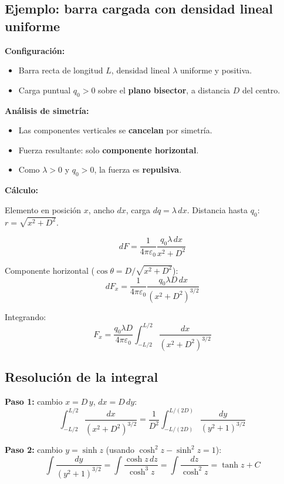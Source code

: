 \documentclass[12pt,a4paper]{article}
\begin{document}
\subsection{Ejemplo: barra cargada con densidad lineal uniforme}

\textbf{Configuración:}
\begin{itemize}[nosep]
  \item Barra recta de longitud $L$, densidad lineal $\lambda$
        uniforme y positiva.
  \item Carga puntual $q_0 > 0$ sobre el \textbf{plano bisector},
        a distancia $D$ del centro.
\end{itemize}

\textbf{Análisis de simetría:}
\begin{itemize}[nosep]
  \item Las componentes verticales se \textbf{cancelan} por simetría.
  \item Fuerza resultante: solo \textbf{componente horizontal}.
  \item Como $\lambda > 0$ y $q_0 > 0$, la fuerza es
        \textbf{repulsiva}.
\end{itemize}



\textbf{Cálculo:}

Elemento en posición $x$, ancho $dx$, carga $dq = \lambda\,dx$.
Distancia hasta $q_0$: $r = \sqrt{x^{2} + D^{2}}$.

\[
dF = \frac{1}{4\pi\varepsilon_0}
\frac{q_0 \lambda\,dx}{x^{2} + D^{2}}
\]

Componente horizontal ($\cos\theta = D/\sqrt{x^{2} + D^{2}}$):
\[
dF_x = \frac{1}{4\pi\varepsilon_0}
\frac{q_0 \lambda D\,dx}{(x^{2} + D^{2})^{3/2}}
\]

Integrando:
\[
F_x = \frac{q_0 \lambda D}{4\pi\varepsilon_0}
\int_{-L/2}^{L/2} \frac{dx}{(x^{2} + D^{2})^{3/2}}
\]

\subsection{Resolución de la integral}

\textbf{Paso 1:} cambio $x = D\,y$, $dx = D\,dy$:
\[
\int_{-L/2}^{L/2} \frac{dx}{(x^{2} + D^{2})^{3/2}}
= \frac{1}{D^{2}}
\int_{-L/(2D)}^{L/(2D)} \frac{dy}{(y^{2} + 1)^{3/2}}
\]

\textbf{Paso 2:} cambio $y = \sinh z$ (usando
$\cosh^{2} z - \sinh^{2} z = 1$):
\[
\int \frac{dy}{(y^{2} + 1)^{3/2}}
= \int \frac{\cosh z\,dz}{\cosh^{3} z}
= \int \frac{dz}{\cosh^{2} z}
= \tanh z + C
\]
\end{document}

